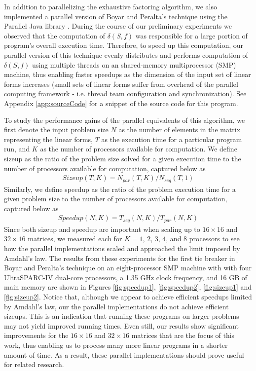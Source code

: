 In addition to parallelizing the exhaustive factoring algorithm, we also implemented a parallel version of Boyar and Peralta's technique using the Parallel Java library \cite{Kaminsky10-1}. During the course of our preliminary experiments we observed that the computation of $\delta(S, f)$ was responsible for a large portion of program's overall execution time. Therefore, to speed up this computation, our parallel version of this technique evenly distributes and performs computation of $\delta(S, f)$ using multiple threads on an shared-memory multiprocessor (SMP) machine, thus enabling faster speedups as the dimension of the input set of linear forms increases (small sets of linear forms suffer from overhead of the parallel computing framework - i.e. thread team configuration and synchronization). See Appendix \ref{app:sourceCode} for a snippet of the source code for this program.

To study the performance gains of the parallel equivalents of this algorithm, we first denote the input problem size $N$ as the number of elements in the matrix representing the linear forms, $T$ as the execution time for a particular program run, and $K$ as the number of processors available for computation. We define sizeup as the ratio of the problem size solved for a given execution time to the number of processors available for computation, captured below as
\begin{align*}
Sizeup(T,K) = N_{par}(T,K) / N_{seq}(T,1)
\end{align*}
Similarly, we define speedup as the ratio of the problem execution time for a given problem size to the number of processors available for computation, captured below as
\begin{align*}
Speedup(N, K) = T_{seq}(N, K) / T_{par}(N, K)
\end{align*}
Since both sizeup and speedup are important when scaling up to $16 \times 16$ and $32 \times 16$ matrices, we measured each for $K = 1$, $2$, $3$, $4$, and $8$ processors to see how the parallel implementations scaled and approached the limit imposed by Amdahl's law. The results from these experiments for the first tie breaker in Boyar and Peralta's technique on an eight-processor SMP machine with with four UltraSPARC-IV dual-core processors, a 1.35 GHz clock frequency, and 16 GB of main memory are shown in Figures \ref{fig:speedup1}, \ref{fig:speedup2}, \ref{fig:sizeup1} and \ref{fig:sizeup2}. Notice that, although we appear to achieve efficient speedups limited by Amdahl's law, our the parallel implementations do not achieve efficient sizeups. This is an indication that running these programs on larger problems may not yield improved running times. Even still, our results show significant improvements for the $16 \times 16$ and $32 \times 16$ matrices that are the focus of this work, thus enabling us to process many more linear programs in a shorter amount of time. As a result, these parallel implementations should prove useful for related research. 

